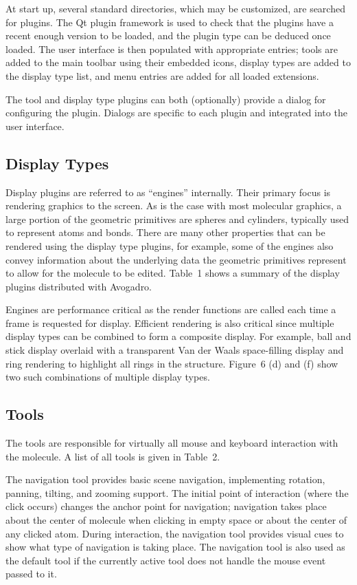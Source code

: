 \documentclass[10pt]{bmc_article}
\newenvironment{bmcformat}{\begin{raggedright}
  \baselineskip20pt\sloppy\setboolean{publ}{false}}{\end{raggedright}
  \baselineskip20pt\sloppy}
\begin{document}
\begin{bmcformat}
At start up, several standard directories, which may be customized, are searched
for plugins. The Qt plugin framework is used to check that the plugins have a
recent enough version to be loaded, and the plugin type can be deduced once
loaded. The user interface is then populated with appropriate entries; tools are
added to the main toolbar using their embedded icons, display types are added to
the display type list, and menu entries are added for all loaded extensions.

The tool and display type plugins can both (optionally) provide a
dialog for configuring the plugin. Dialogs are specific to each plugin
and integrated into the user interface.

\subsection*{Display Types}

Display plugins are referred to as ``engines'' internally. Their
primary focus is rendering graphics to the screen. As is the case with most
molecular graphics, a large portion of the geometric primitives are spheres and
cylinders, typically used to represent atoms and bonds. There are many other
properties that can be rendered using the display type plugins, for example,
some of the engines also convey information about the underlying data the
geometric primitives represent to allow for the molecule to be edited. Table~1
shows a summary of the display plugins distributed with Avogadro.

Engines are performance critical as the render functions are called each time a
frame is requested for display.  Efficient rendering is also critical
since multiple display types can be combined to form a composite display. For
example, ball and stick display overlaid with a transparent Van der Waals
space-filling display and ring rendering to highlight all rings in the
structure. Figure~6 (d) and (f) show two such combinations of
multiple display types.

\subsection*{Tools}

The tools are responsible for virtually all mouse and keyboard interaction with
the molecule. A list of all tools is given in Table~2.

The navigation tool provides basic scene navigation, implementing rotation,
panning, tilting, and zooming support. The initial point of interaction (where
the click occurs) changes the anchor point for navigation; navigation takes
place about the center of molecule when clicking in empty space or about the
center of any clicked atom. During interaction, the navigation tool provides
visual cues to show what type of navigation is taking place. The navigation
tool is also used as the default tool if the currently active tool does not
handle the mouse event passed to it.


\end{bmcformat}
\end{document}
